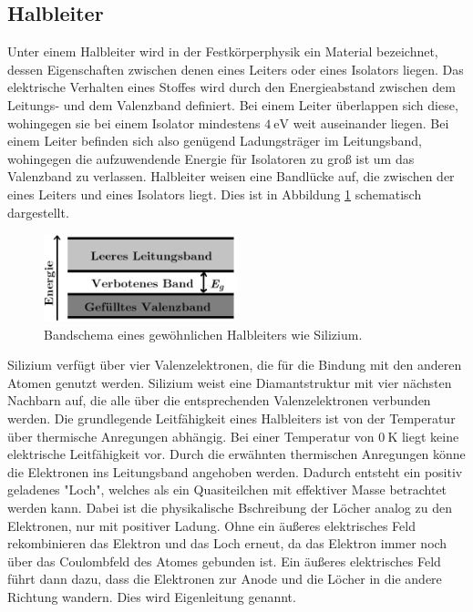 \subsection{Halbleiter}

Unter einem Halbleiter wird in der Festkörperphysik ein Material bezeichnet, dessen Eigenschaften zwischen denen eines Leiters oder eines Isolators liegen.
Das elektrische Verhalten eines Stoffes wird durch den Energieabstand zwischen dem Leitungs- und dem Valenzband definiert.
Bei einem Leiter überlappen sich diese, wohingegen sie bei einem Isolator mindestens $\SI{4}{\electronvolt}$ weit auseinander liegen.
Bei einem Leiter befinden sich also genügend Ladungsträger im Leitungsband, wohingegen die aufzuwendende Energie für Isolatoren zu groß ist um das Valenzband zu verlassen.
Halbleiter weisen eine Bandlücke auf, die zwischen der eines Leiters und eines Isolators liegt.
Dies ist in Abbildung \ref{fig:bandschema} schematisch dargestellt.

\begin{figure}
  \centering
  \includegraphics[width=0.5\textwidth]{content/graphics/Bandluecke.png}
  \caption{Bandschema eines gewöhnlichen Halbleiters wie Silizium.}
  \label{fig:bandschema}
\end{figure}

Silizium verfügt über vier Valenzelektronen, die für die Bindung mit den anderen Atomen genutzt werden.
Silizium weist eine Diamantstruktur mit vier nächsten Nachbarn auf, die alle über die entsprechenden Valenzelektronen verbunden werden.
Die grundlegende Leitfähigkeit eines Halbleiters ist von der Temperatur über thermische Anregungen abhängig.
Bei einer Temperatur von $\SI{0}{\kelvin}$ liegt keine elektrische Leitfähigkeit vor.
Durch die erwähnten thermischen Anregungen könne die Elektronen ins Leitungsband angehoben werden.
Dadurch entsteht ein positiv geladenes "Loch", welches als ein Quasiteilchen mit effektiver Masse betrachtet werden kann.
Dabei ist die physikalische Bschreibung der Löcher analog zu den Elektronen, nur mit positiver Ladung.
Ohne ein äußeres elektrisches Feld rekombinieren das Elektron und das Loch erneut, da das Elektron immer noch über das Coulombfeld des Atomes gebunden ist.
Ein äußeres elektrisches Feld führt dann dazu, dass die Elektronen zur Anode und die Löcher in die andere Richtung wandern.
Dies wird Eigenleitung genannt.


